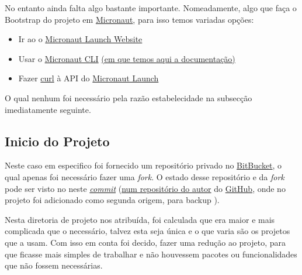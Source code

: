 No entanto ainda falta algo bastante importante. Nomeadamente, algo que faça o Bootstrap do projeto em \href{https://micronaut.io/}{Micronaut}, para isso temos variadas opções:

\begin{itemize}
  \item Ir ao o \href{https://micronaut.io/launch}{Micronaut Launch Website}
  \item Usar o \href{https://micronaut.io/download/}{Micronaut CLI} \href{https://micronaut-projects.github.io/micronaut-starter/latest/guide/index.html}{(em que temos aqui a documentação)}
  \item Fazer \href{https://curl.se/}{curl} à API do \href{https://launch.micronaut.io/create/default/com.optiply.project.webshop?lang=JAVA&build=GRADLE&test=JUNIT&javaVersion=JDK_17&features=jackson-databind&features=kubernetes-reactor-client&features=properties&features=flyway&features=jdbc-hikari&features=jooq&features=postgres&features=r2dbc&features=testcontainers&features=lombok&features=mockito&features=openrewrite&features=asciidoctor&features=logback&features=reactor&features=security-jwt&features=problem-json&features=jackson-xml}{Micronaut Launch}
\end{itemize}

O qual nenhum foi necessário pela razão estabelecidade na subsecção imediatamente seguinte.

\subsection{Inicio do Projeto}

Neste caso em especifico foi fornecido um repositório privado no \href{https://bitbucket.org/}{BitBucket}, o qual apenas foi necessário fazer uma \textit{fork}. O estado desse repositório e da \textit{fork} pode ser visto no neste \href{https://github.com/CatKinKitKat/MicronautJooqPostgresREST/tree/07d359ce933dde634f176dc95bf5ac1b3e4bc93d}{\textit{commit}} (\href{https://github.com/CatKinKitKat/MicronautJooqPostgresREST}{num repositório do autor} do \href{https://github.com/}{GitHub}, onde no projeto foi adicionado como segunda origem, para backup \cite{backup}).

Nesta diretoria de projeto nos atribuída, foi calculada que era maior e mais complicada que o necessário, talvez esta seja única e o que varia são os projetos que a usam. Com isso em conta foi decido, fazer uma redução ao projeto, para que ficasse mais simples de trabalhar e não houvessem pacotes ou funcionalidades que não fossem necessárias.

